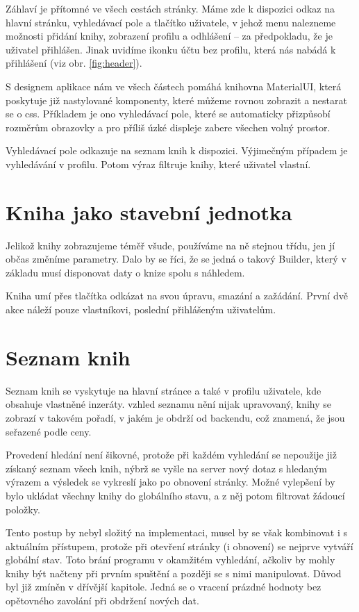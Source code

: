 \documentclass[a4paper,oneside,12pt]{report}
\begin{document}
Záhlaví je přítomné ve všech cestách stránky. Máme zde k dispozici odkaz na hlavní
stránku, vyhledávací pole a tlačítko uživatele, v jehož menu nalezneme možnosti přidání
knihy, zobrazení profilu a odhlášení -- za předpokladu, že je uživatel přihlášen. Jinak
uvidíme ikonku účtu bez profilu, která nás nabádá k přihlášení (viz obr.
\ref{fig:header}).

S designem aplikace nám ve všech částech pomáhá knihovna MaterialUI, která poskytuje již
nastylované komponenty, které můžeme rovnou zobrazit a nestarat se o css. Příkladem je ono
vyhledávací pole, které se automaticky přizpůsobí rozměrům obrazovky a pro příliš úzké
displeje zabere všechen volný prostor.

Vyhledávací pole odkazuje na seznam knih k dispozici. Výjimečným případem je vyhledávání v
profilu. Potom výraz filtruje knihy, které uživatel vlastní.

\section{Kniha jako stavební jednotka}
Jelikož knihy zobrazujeme téměř všude, používáme na ně stejnou třídu, jen jí občas změníme
parametry. Dalo by se říci, že se jedná o takový Builder, který v základu musí disponovat
daty o knize spolu s náhledem.

Kniha umí přes tlačítka odkázat na svou úpravu, smazání a zažádání. První dvě akce náleží
pouze vlastníkovi, poslední přihlášeným uživatelům.

\section{Seznam knih}
Seznam knih se vyskytuje na hlavní stránce a také v profilu uživatele, kde obsahuje
vlastněné inzeráty. vzhled seznamu nění nijak upravovaný, knihy se zobrazí v takovém
pořadí, v jakém je obdrží od backendu, což znamená, že jsou seřazené podle ceny.

Provedení hledání není šikovné, protože při každém vyhledání se nepoužije již získaný
seznam všech knih, nýbrž se vyšle na server nový dotaz s hledaným výrazem a\,\,výsledek se
vykreslí jako po obnovení stránky. Možné vylepšení by bylo ukládat všechny knihy do
globálního stavu, a z něj potom filtrovat žádoucí položky.

Tento postup by nebyl složitý na implementaci, musel by se však kombinovat
i\,\,s\,\,aktuálním přístupem, protože při otevření stránky (i obnovení) se nejprve
vytváří globální stav. Toto brání programu v okamžitém vyhledání, ačkoliv by mohly knihy
být načteny při prvním spuštění a později se s nimi manipulovat. Důvod byl již zmíněn v
dřívější kapitole. Jedná se o vracení prázdné hodnoty bez opětovného zavolání při obdržení
nových dat.
\end{document}
